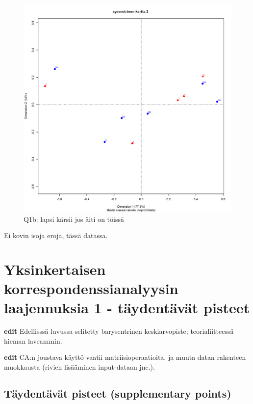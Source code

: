 \documentclass[
  finnish,
]{book}
\begin{document}
\begin{figure}

{\centering \includegraphics[width=0.9\linewidth]{JH_capaper_files/figure-latex/simpleCA3map1-1} 

}

\caption{Q1b: lapsi kärsii jos äiti on töissä}\label{fig:simpleCA3map1}
\end{figure}

Ei kovin isoja eroja, tässä datassa.

\hypertarget{yksinkertaisen-korrespondenssianalyysin-laajennuksia-1---tuxe4ydentuxe4vuxe4t-pisteet}{%
\chapter{Yksinkertaisen korrespondenssianalyysin laajennuksia 1 - täydentävät pisteet}\label{yksinkertaisen-korrespondenssianalyysin-laajennuksia-1---tuxe4ydentuxe4vuxe4t-pisteet}}

\textbf{edit} Edellisssä luvussa selitetty barysentrinen keskiarvopiste;
teorialiitteessä hieman laveammin.

\textbf{edit} CA:n joustava käyttö vaatii matriisioperaatioita, ja muuta datan rakenteen
muokkausta (rivien lisääminen input-dataan jne.).

\hypertarget{tuxe4ydentuxe4vuxe4t-pisteet-supplementary-points}{%
\section{Täydentävät pisteet (supplementary points)}\label{tuxe4ydentuxe4vuxe4t-pisteet-supplementary-points}}
\end{document}
